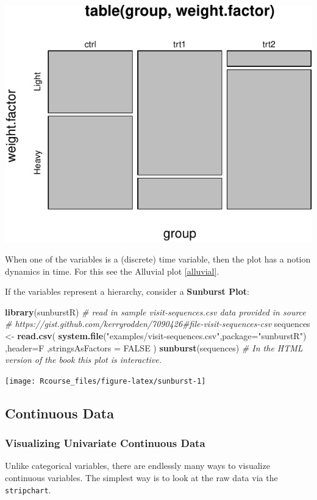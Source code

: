 \documentclass[]{book}
\newenvironment{Shaded}{\begin{snugshade}}{\end{snugshade}}
\newcommand{\KeywordTok}[1]{\textcolor[rgb]{0.13,0.29,0.53}{\textbf{#1}}}
\newcommand{\DataTypeTok}[1]{\textcolor[rgb]{0.13,0.29,0.53}{#1}}
\newcommand{\StringTok}[1]{\textcolor[rgb]{0.31,0.60,0.02}{#1}}
\newcommand{\CommentTok}[1]{\textcolor[rgb]{0.56,0.35,0.01}{\textit{#1}}}
\newcommand{\OtherTok}[1]{\textcolor[rgb]{0.56,0.35,0.01}{#1}}
\newcommand{\NormalTok}[1]{#1}
\theoremstyle{definition}
\theoremstyle{definition}
\theoremstyle{definition}
\theoremstyle{remark}
\begin{document}
\includegraphics[width=0.5\linewidth]{Rcourse_files/figure-latex/unnamed-chunk-130-1}

When one of the variables is a (discrete) time variable, then the plot
has a notion dynamics in time. For this see the Alluvial plot
\ref{alluvial}.

If the variables represent a hierarchy, consider a \textbf{Sunburst
Plot}:

\begin{Shaded}
\begin{Highlighting}[]
\KeywordTok{library}\NormalTok{(sunburstR)}
\CommentTok{# read in sample visit-sequences.csv data provided in source}
\CommentTok{# https://gist.github.com/kerryrodden/7090426#file-visit-sequences-csv}
\NormalTok{sequences <-}\StringTok{ }\KeywordTok{read.csv}\NormalTok{(}
  \KeywordTok{system.file}\NormalTok{(}\StringTok{"examples/visit-sequences.csv"}\NormalTok{,}\DataTypeTok{package=}\StringTok{"sunburstR"}\NormalTok{)}
\NormalTok{  ,}\DataTypeTok{header=}\NormalTok{F}
\NormalTok{  ,}\DataTypeTok{stringsAsFactors =} \OtherTok{FALSE}
\NormalTok{)}
\KeywordTok{sunburst}\NormalTok{(sequences) }\CommentTok{# In the HTML version of the book this plot is interactive.}
\end{Highlighting}
\end{Shaded}

\texttt{[image: Rcourse\_files/figure-latex/sunburst-1]}

\subsection{Continuous Data}\label{continuous-data}

\subsubsection{Visualizing Univariate Continuous
Data}\label{visualizing-univariate-continuous-data}

Unlike categorical variables, there are endlessly many ways to visualize
continuous variables. The simplest way is to look at the raw data via
the \texttt{stripchart}.
\end{document}

